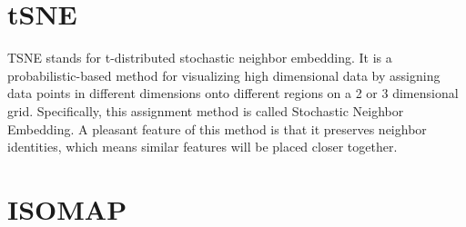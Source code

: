 \section{tSNE}
\label{app:stat:tsne}
TSNE stands for t-distributed stochastic neighbor embedding. It is a probabilistic-based method for visualizing high dimensional data by assigning data points in different dimensions onto different regions on a 2 or 3 dimensional grid. Specifically, this assignment method is called Stochastic Neighbor Embedding\cite{hintonStochasticNeighborEmbedding2002}. A pleasant feature of this method is that it preserves neighbor identities, which means similar features will be placed closer together.

\section{ISOMAP}
\label{app:stat:isomap}





